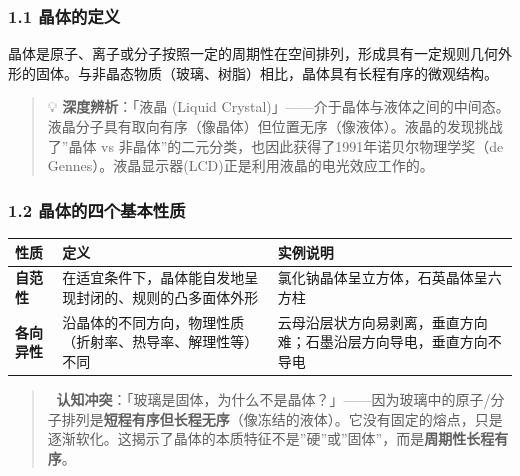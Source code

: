 \documentclass[a4paper,11pt]{ctexart}
\newcounter{none}
\begin{document}
\subsubsection{1.1 晶体的定义}\label{ux6676ux4f53ux7684ux5b9aux4e49}

晶体是原子、离子或分子按照一定的周期性在空间排列，形成具有一定规则几何外形的固体。与非晶态物质（玻璃、树脂）相比，晶体具有长程有序的微观结构。

\begin{quote}
💡 \textbf{深度辨析}：「液晶 (Liquid Crystal)」------介于晶体与液体之间的中间态。液晶分子具有取向有序（像晶体）但位置无序（像液体）。液晶的发现挑战了''晶体 vs 非晶体''的二元分类，也因此获得了1991年诺贝尔物理学奖（de Gennes）。液晶显示器(LCD)正是利用液晶的电光效应工作的。
\end{quote}

\subsubsection{1.2 晶体的四个基本性质}\label{ux6676ux4f53ux7684ux56dbux4e2aux57faux672cux6027ux8d28}

{\def\LTcaptype{none} %
\begin{longtable}[]{@{}
  >{\raggedright\arraybackslash}p{}
  >{\raggedright\arraybackslash}p{}
  >{\raggedright\arraybackslash}p{}@{}}
\toprule\noalign{}
\begin{minipage}[b]{\linewidth}\raggedright
性质
\end{minipage} & \begin{minipage}[b]{\linewidth}\raggedright
定义
\end{minipage} & \begin{minipage}[b]{\linewidth}\raggedright
实例说明
\end{minipage} \\
\midrule\noalign{}
\endhead
\bottomrule\noalign{}
\endlastfoot
\textbf{自范性} & 在适宜条件下，晶体能自发地呈现封闭的、规则的凸多面体外形 & 氯化钠晶体呈立方体，石英晶体呈六方柱 \\
\textbf{各向异性} & 沿晶体的不同方向，物理性质（折射率、热导率、解理性等）不同 & 云母沿层状方向易剥离，垂直方向难；石墨沿层方向导电，垂直方向不导电 \\
\end{longtable}
}

\begin{quote}
🧠 \textbf{认知冲突}：「玻璃是固体，为什么不是晶体？」------因为玻璃中的原子/分子排列是\textbf{短程有序但长程无序}（像冻结的液体）。它没有固定的熔点，只是逐渐软化。这揭示了晶体的本质特征不是''硬''或''固体''，而是\textbf{周期性长程有序}。
\end{quote}
\end{document}
